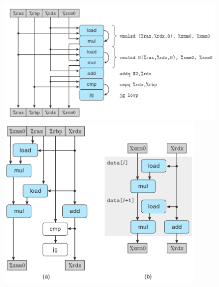 \begin{figure}[!ht]
    \centering
    \begin{minipage}{0.65\textwidth}
        \centering
        \includegraphics[width=\textwidth]{img/5-5}
        \includegraphics[width=0.9\textwidth]{img/5-6}
    \end{minipage}
    \begin{minipage}{0.33\textwidth}
        \centering

\end{minipage}
\end{figure}

